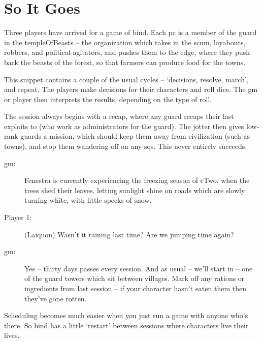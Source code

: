 \section[Example of Play]{So It Goes}

\begin{multicols}{3}

\noindent
Three players have arrived for a game of \gls{bind}.
Each \gls{pc} is a member of the \gls{guard} in the \gls{templeOfBeasts} -- the organization which takes in the scum, layabouts, robbers, and political-agitators, and pushes them to the \gls{edge}, where they push back the beasts of the forest, so that farmers can produce food for the towns.

This snippet contains a couple of the usual cycles -- `decisions, resolve, march', and repeat.
The players make decisions for their characters and roll dice.
The \gls{gm} or player then interprets the results, depending on the type of roll.

The session always begins with a recap, where any \gls{guard} recaps their last exploits to  (who work as administrators for the \gls{guard}).
The \gls{jotter} then gives low-rank \glspl{guard} a mission, which should keep them away from civilization (such as towns), and stop them wandering off on any \glspl{sq}.
This never entirely succeeds.

\begin{description}
  \item[\gls{gm}:]
  Fenestra is currently experiencing the freezing season of \gls{cTwo}, when the trees shed their leaves, letting sunlight shine on roads which are slowly turning white, with little specks of snow.

  \item[Player 1:]
  (Laiquon)
  Wasn't it raining last time? Are we jumping time again?

  \item[\gls{gm}:]
  Yes -- thirty days passes every session.
  And as usual -- we'll start in  -- one of the \gls{guard} towers which sit between \glspl{village}.
  Mark off any rations or \glspl{ingredient} from last session -- if your character hasn't eaten them then they've gone rotten.
\end{description}

\bigLine
\vspace{\baselineskip}
Scheduling becomes much easier when you just run a game with anyone who's there.
So \gls{bind} has a little `restart' between sessions where characters live their lives.


\end{multicols}
